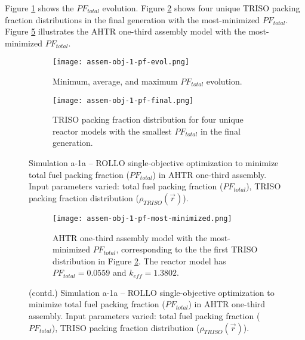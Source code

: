 Figure \ref{fig:assem-obj-1-pf-evol} shows the $PF_{total}$ evolution.
Figure \ref{fig:assem-obj-1-pf-final} shows four unique TRISO packing fraction 
distributions in the final generation with the most-minimized $PF_{total}$. 
Figure \ref{fig:assem-obj-1-pf-most-minimized} illustrates the \gls{AHTR} one-third 
assembly model with the most-minimized $PF_{total}$.
\begin{figure}[htbp!]
    \begin{subfigure}{\textwidth}
        \centering
        \texttt{[image: assem-obj-1-pf-evol.png]}
        \caption{Minimum, average, and maximum $PF_{total}$ evolution.}
        \label{fig:assem-obj-1-pf-evol} 
    \end{subfigure}
    \begin{subfigure}{\textwidth}
        \centering
        \texttt{[image: assem-obj-1-pf-final.png]}
        \caption{TRISO packing fraction distribution for four unique reactor models with the 
        smallest $PF_{total}$ in the final generation.}
        \label{fig:assem-obj-1-pf-final} 
    \end{subfigure}
    \caption{Simulation a-1a -- ROLLO single-objective optimization to minimize total 
    fuel packing fraction ($PF_{total}$) in \gls{AHTR} one-third assembly. 
    Input parameters varied: total fuel packing fraction 
    ($PF_{total}$), \gls{TRISO} packing fraction distribution ($\rho_{TRISO}(\vec{r})$).}
    \label{fig:assem-obj-1-pf}
\end{figure}
\begin{figure}[htbp!]
    \ContinuedFloat
    \begin{subfigure}{\textwidth}
        \centering
        \texttt{[image: assem-obj-1-pf-most-minimized.png]}
        \caption{\gls{AHTR} one-third assembly model with the most-minimized 
        $PF_{total}$, corresponding to the the first TRISO distribution in Figure 
        \ref{fig:assem-obj-1-pf-final}. The reactor model has $PF_{total}=0.0559$
        and $k_{eff}=1.3802$.}
        \label{fig:assem-obj-1-pf-most-minimized} 
    \end{subfigure}
    \caption{(contd.) Simulation a-1a -- ROLLO single-objective optimization to minimize total 
    fuel packing fraction ($PF_{total}$) in \gls{AHTR} one-third assembly. 
    Input parameters varied: total fuel packing fraction 
    ($PF_{total}$), \gls{TRISO} packing fraction distribution ($\rho_{TRISO}(\vec{r})$).}
\end{figure}

